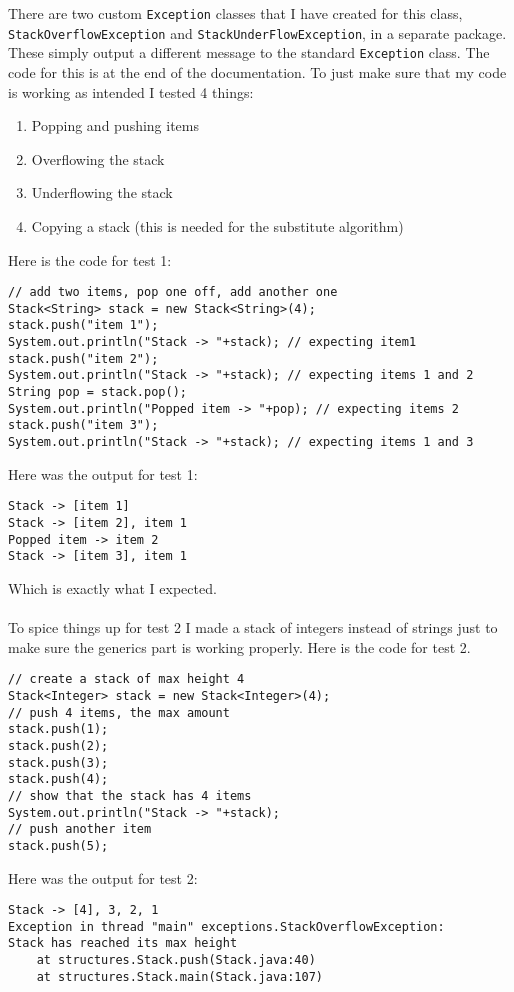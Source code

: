 \documentclass[../../../../main.tex]{subfiles}
\begin{document}
There are two custom \texttt{Exception} classes that I have created for this class, \texttt{StackOverflowException} and \texttt{StackUnderFlowException}, in a separate package. These simply output a different message to the standard \texttt{Exception} class. The code for this is at the end of the documentation.
\newpage
\noindent
To just make sure that my code is working as intended I tested 4 things:
\begin{enumerate}
\item Popping and pushing items
\item Overflowing the stack
\item Underflowing the stack
\item Copying a stack (this is needed for the substitute algorithm)
\end{enumerate}
Here is the code for test 1:
\begin{verbatim}
// add two items, pop one off, add another one
Stack<String> stack = new Stack<String>(4);
stack.push("item 1");
System.out.println("Stack -> "+stack); // expecting item1
stack.push("item 2");
System.out.println("Stack -> "+stack); // expecting items 1 and 2
String pop = stack.pop();
System.out.println("Popped item -> "+pop); // expecting items 2
stack.push("item 3");
System.out.println("Stack -> "+stack); // expecting items 1 and 3
\end{verbatim}
Here was the output for test 1:
\begin{verbatim}
Stack -> [item 1]
Stack -> [item 2], item 1
Popped item -> item 2
Stack -> [item 3], item 1
\end{verbatim}
Which is exactly what I expected.\\ \\
To spice things up for test 2 I made a stack of integers instead of strings just to make sure the generics part is working properly. Here is the code for test 2.
\begin{verbatim}
// create a stack of max height 4
Stack<Integer> stack = new Stack<Integer>(4);
// push 4 items, the max amount
stack.push(1);
stack.push(2);
stack.push(3);
stack.push(4);
// show that the stack has 4 items
System.out.println("Stack -> "+stack);
// push another item
stack.push(5);
\end{verbatim}
Here was the output for test 2:
\begin{verbatim}
Stack -> [4], 3, 2, 1
Exception in thread "main" exceptions.StackOverflowException:
Stack has reached its max height
	at structures.Stack.push(Stack.java:40)
	at structures.Stack.main(Stack.java:107)
\end{verbatim}
\end{document}
